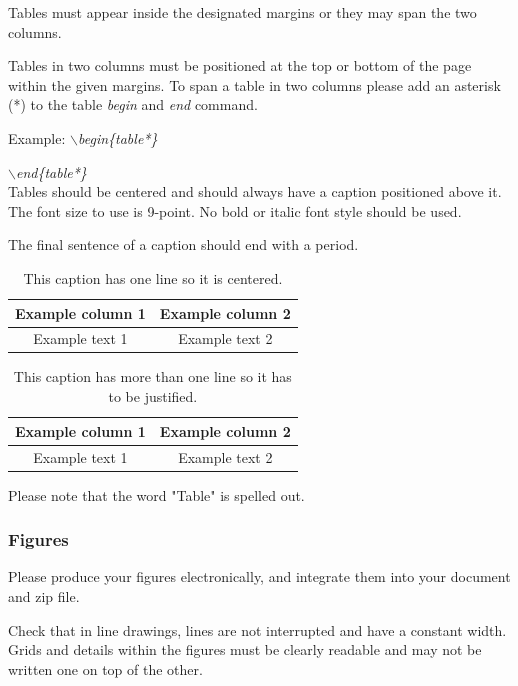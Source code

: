 \documentclass[a4paper,twoside]{article}
\begin{document}
\noindent Tables must appear inside the designated margins or they may span
the two columns.

Tables in two columns must be positioned at the top or bottom of the
page within the given margins. To span a table in two columns please add an asterisk (*) to the table \textit{begin} and \textit{end} command.

Example: \textit{$\backslash$begin\{table*\}}

\hspace*{1.5cm}\textit{$\backslash$end\{table*\}}\\

Tables should be centered and should always have a caption
positioned above it. The font size to use is 9-point. No bold or
italic font style should be used.

The final sentence of a caption should end with a period.

\begin{table}[h]
\caption{This caption has one line so it is
centered.}\label{tab:example1} \centering
\begin{tabular}{|c|c|}
  \hline
  Example column 1 & Example column 2 \\
  \hline
  Example text 1 & Example text 2 \\
  \hline
\end{tabular}
\end{table}

\begin{table}[h]
\caption{This caption has more than one line so it has to be
justified.}\label{tab:example2} \centering
\begin{tabular}{|c|c|}
  \hline
  Example column 1 & Example column 2 \\
  \hline
  Example text 1 & Example text 2 \\
  \hline
\end{tabular}
\end{table}

Please note that the word "Table" is spelled out.


\subsubsection{Figures}

\noindent Please produce your figures electronically, and integrate them into
your document and zip file.

Check that in line drawings, lines are not interrupted and have a
constant width. Grids and details within the figures must be clearly
readable and may not be written one on top of the other.
\end{document}
